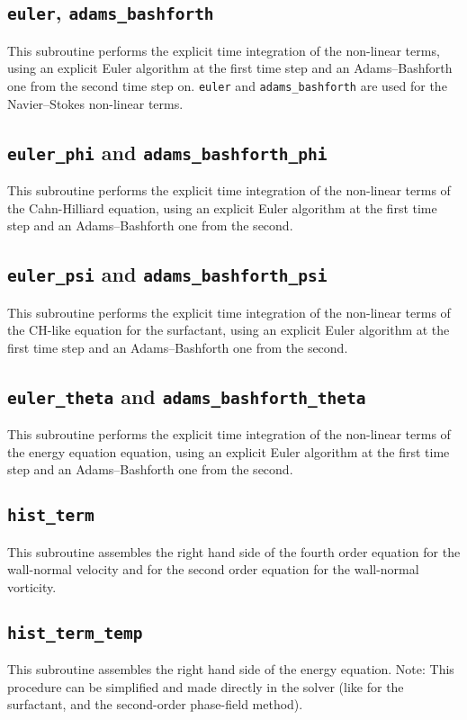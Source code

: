 \subsection{\texttt{euler}, \texttt{adams\_bashforth}}
This subroutine performs the explicit time integration of the non-linear terms, using an explicit Euler algorithm at the first time step and an Adams--Bashforth one from the second time step on. 
\texttt{euler} and \texttt{adams\_bashforth} are used for the Navier--Stokes non-linear terms.

\subsection{\texttt{euler\_phi} and \texttt{adams\_bashforth\_phi}}
This subroutine performs the explicit time integration of the non-linear terms of the Cahn-Hilliard equation, using an explicit Euler algorithm at the first time step and an Adams--Bashforth one from the second.

\subsection{\texttt{euler\_psi} and \texttt{adams\_bashforth\_psi}}
This subroutine performs the explicit time integration of the non-linear terms of the CH-like equation for the surfactant, using an explicit Euler algorithm at the first time step and an Adams--Bashforth one from the second.

\subsection{\texttt{euler\_theta} and \texttt{adams\_bashforth\_theta}}
This subroutine performs the explicit time integration of the non-linear terms of the energy equation equation, using an explicit Euler algorithm at the first time step and an Adams--Bashforth one from the second.

\subsection{\texttt{hist\_term}}
This subroutine assembles the right hand side of the fourth order equation for the wall-normal velocity and for the second order equation for the wall-normal vorticity.

\subsection{\texttt{hist\_term\_temp}}
This subroutine assembles the right hand side of the energy equation.
Note: This procedure can be simplified and made directly in the solver (like for the surfactant, and the second-order phase-field method).

